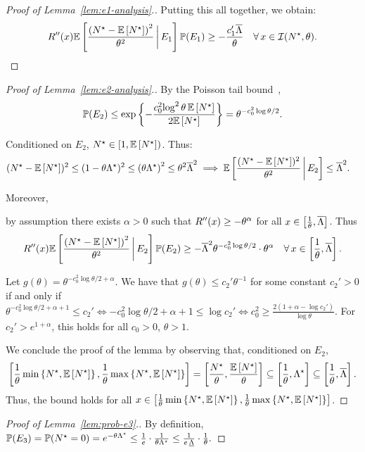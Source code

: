 \documentclass[12pt]{article}
\begin{document}
\begin{proof}[Proof of Lemma~\ref{lem:e1-analysis}.]
Putting this all together, we obtain:
\begin{align*}
R''(x)\mathbb{E}\left[\frac{\left({N}^\star-\mathbb{E}\left[{N}^\star\right]\right)^2}{\theta^2}\,\bigg{|}\,E_1\right]\mathbb{P}(E_1) \geq -\frac{c_1'\overline{\Lambda}}{\theta} \quad \forall \, x \in \mathcal{I}({N}^\star,\theta).
\end{align*}
\end{proof}



\begin{proof}[Proof of Lemma~\ref{lem:e2-analysis}.]
By the Poisson tail bound~\cite{canonne2017short}, 
\begin{align*}\mathbb{P}(E_2) \leq \exp\left\{-\frac{c_0^2{\log^2\theta}\,\mathbb{E}\left[{N}^\star\right]}{2\mathbb{E}\left[{N}^\star\right]}\right\} = \theta^{-c_0^2\log\theta/2}.
\end{align*}

Conditioned on $E_2$, ${N}^\star \in [1,\mathbb{E}\left[{N}^\star\right])$. Thus:
\begin{align*}
&({N}^\star-\mathbb{E}\left[{N}^\star\right])^2 \leq (1-\theta\Lambda^\star)^2 \leq \left(\theta\Lambda^\star\right)^2 \leq \theta^2\overline{\Lambda}^2
\implies \mathbb{E}\left[\frac{({N}^\star-\mathbb{E}\left[{N}^\star\right])^2}{\theta^2}\,\bigg{|}\,E_2\right] \leq \overline{\Lambda}^2.
\end{align*}

Moreover, {by assumption there exists $\alpha > 0$ such that $R''(x) \geq -\theta^{\alpha}$ for all $x \in \left[\frac1\theta,\overline{\Lambda}\right]$. Thus 
\begin{align}
    R''(x) \mathbb{E}\left[\frac{\left({N}^\star-\mathbb{E}\left[{N}^\star\right]\right)^2}{\theta^2}\,\bigg{|}\,E_2\right]\mathbb{P}(E_2) \geq -\overline{\Lambda}^2 \theta^{-c_0^2\log\theta/2}\cdot \theta^{\alpha} \quad \forall\, x \in  \left[\frac1\theta,\overline{\Lambda}\right].
\end{align}

Let $g(\theta) = \theta^{-c_0^2\log\theta/2 + \alpha}.$ We have that $g(\theta) \leq c_2' \theta^{-1}$ for some constant $c_2' > 0$ if and only if $\theta^{-c_0^2\log\theta/2+\alpha+1} \leq c_2' \iff -c_0^2\log\theta/2+\alpha+1 \leq \log c_2' \iff c_0^2 \geq \frac{2(1+\alpha-\log c_2')}{\log\theta}$. For {$c_2' > e^{1+\alpha}$}, this holds for all $c_0 > 0$, $\theta > 1$.}

We conclude the proof of the lemma by observing that, conditioned on $E_2$, $$\left[\frac1\theta\min\left\{{N}^\star,{\mathbb{E}\left[{N}^\star\right]}\right\},\frac1\theta\max\left\{{{N}^\star},{\mathbb{E}\left[{N}^\star\right]}\right\}\right] = \left[\frac{{N}^\star}{\theta},\frac{\mathbb{E}\left[{N}^\star\right]}{\theta}\right]\subseteq \left[\frac1\theta,\Lambda^\star\right] \subseteq\left[\frac1\theta,\overline{\Lambda}\right].$$  Thus, the bound holds for all $x \in \left[\frac1\theta\min\left\{{N}^\star,{\mathbb{E}\left[{N}^\star\right]}\right\},\frac1\theta\max\left\{{{N}^\star},{\mathbb{E}\left[{N}^\star\right]}\right\}\right]$.
\end{proof}



\begin{proof}[Proof of Lemma~\ref{lem:prob-e3}.]
By definition,
$\mathbb{P}(E_3) = \mathbb{P}({N}^\star = 0) = e^{-\theta\Lambda^\star} \leq \frac1e \cdot \frac{1}{\theta\Lambda^\star} \leq \frac{1}{e\,\underline{\Lambda}}\cdot\frac1\theta.$
\end{proof}
\end{document}
